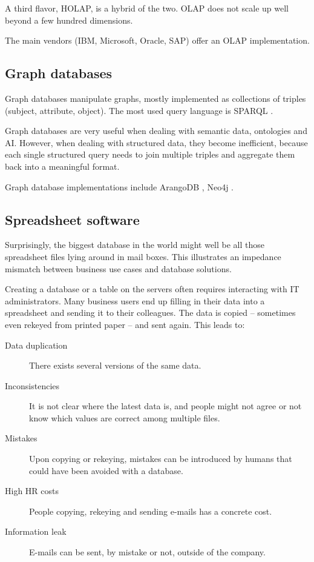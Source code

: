 \documentclass{acm_proc_article-sp}
\begin{document}
A third flavor, HOLAP, is a hybrid of the two. OLAP does not scale up well beyond a few hundred dimensions.

The main vendors (IBM, Microsoft, Oracle, SAP) offer an OLAP implementation.

\subsection{Graph databases}

Graph databases manipulate graphs, mostly implemented as collections of triples (subject, attribute, object). The most used query language is SPARQL \cite{SPARQL}.

Graph databases are very useful when dealing with semantic data, ontologies and AI. However, when dealing with structured data, they become inefficient, because each single structured query needs to join multiple triples and aggregate them back into a meaningful format.

Graph database implementations include ArangoDB \cite{ArangoDB}, Neo4j \cite{Neo4j}.

\subsection{Spreadsheet software}

Surprisingly, the biggest database in the world might well be all those spreadsheet files lying around in mail boxes. This illustrates an impedance mismatch between business use cases and database solutions.

Creating a database or a table on the servers often requires interacting with IT administrators. Many business users end up filling in their data into a spreadsheet and sending it to their colleagues. The data is copied -- sometimes even rekeyed from printed paper -- and sent again. This leads to:

\begin{description}
\item[Data duplication] There exists several versions of the same data.
\item [Inconsistencies] It is not clear where the latest data is, and people might not agree or not know which values are correct among multiple files.
\item[Mistakes] Upon copying or rekeying, mistakes can be introduced by humans that could have been avoided with a database.
\item[High HR costs] People copying, rekeying and sending e-mails has a concrete cost.
\item[Information leak] E-mails can be sent, by mistake or not, outside of the company.
\end{description}
\end{document}
